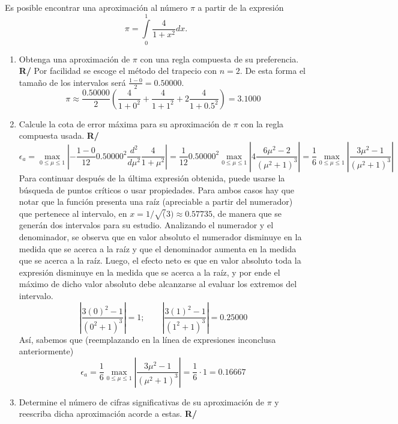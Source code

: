 \documentclass[12pt]{article}
\newcommand{\diff}[3]{\frac{d^{#3} #1}{d#2^{#3}}}
\begin{document}
  \begin{enumerate}[leftmargin=*,widest=9]
{\footnotesize
    \item Es posible encontrar una aproximación al número \(\pi \) a partir de la expresión
    \[ \pi = \int\limits_0^1 \frac{4}{1+x^2}dx.\]
    \begin{enumerate}[label=\alph*]
    \item Obtenga una aproximación de \(\pi \) con una regla compuesta de su preferencia.
    \textbf{R/} Por facilidad se escoge el método del trapecio con \(n=2\). De esta forma el tamaño de los intervalos será \( \frac{1-0}{2} = 0.50000\).
    \[ \pi \approx \frac{0.50000}{2}\left(\frac{4}{1+0^2} + \frac{4}{1+1^2} + 2\frac{4}{1+0.5^2}\right) = 3.1000 \]
    \item Calcule la cota de error máxima para su aproximación de \(\pi \) con la regla compuesta usada.
\textbf{R/}
\[
\epsilon_a = \max\limits_{0 \leq \mu \leq 1} \left\vert -\frac{1-0}{12}0.50000^2\diff{}{\mu}{2}\frac{4}{1+\mu^2} \right\vert = \frac{1}{12}0.50000^2 \max\limits_{0 \leq \mu \leq 1} \left\vert 4\frac{6\mu^2-2}{{(\mu^2+1)}^3} \right\vert = \frac{1}{6} \max\limits_{0 \leq \mu \leq 1} \left\vert \frac{3\mu^2-1}{{(\mu^2+1)}^3} \right\vert
\]
Para continuar después de la última expresión obtenida, puede usarse la búsqueda de puntos críticos o usar propiedades.
Para ambos casos hay que notar que la función presenta una raíz (apreciable a partir del numerador) que pertenece al intervalo, en \(x = 1/\sqrt(3) \approx 0.57735\), de manera que se generán dos intervalos para su estudio.
Analizando el numerador y el denominador, se observa que en valor absoluto el numerador disminuye en la medida que se acerca a la raíz y que el denominador aumenta en la medida que se acerca a la raíz. Luego, el efecto neto es que en valor absoluto toda la expresión disminuye en la medida que se acerca a la raíz, y por ende el máximo de dicho valor absoluto debe alcanzarse al evaluar los extremos del intervalo.
\[
\left\vert \frac{3{(0)}^2-1}{{(0^2+1)}^3} \right\vert = 1; \qquad \left\vert \frac{3{(1)}^2-1}{{(1^2+1)}^3} \right\vert = 0.25000
\]
Así, sabemos que (reemplazando en la línea de expresiones inconclusa anteriormente)
\[
\epsilon_a = \frac{1}{6} \max\limits_{0 \leq \mu \leq 1} \left\vert \frac{3\mu^2-1}{{(\mu^2+1)}^3} \right\vert = \frac{1}{6}\cdot 1 = 0.16667
\]
    \item Determine el número de cifras significativas de su aproximación de \(\pi \) y reescriba dicha aproximación acorde a estas.
\textbf{R/}
\begin{eqnarray*}

\end{eqnarray*}
\end{enumerate}}
\end{enumerate}
\end{document}
